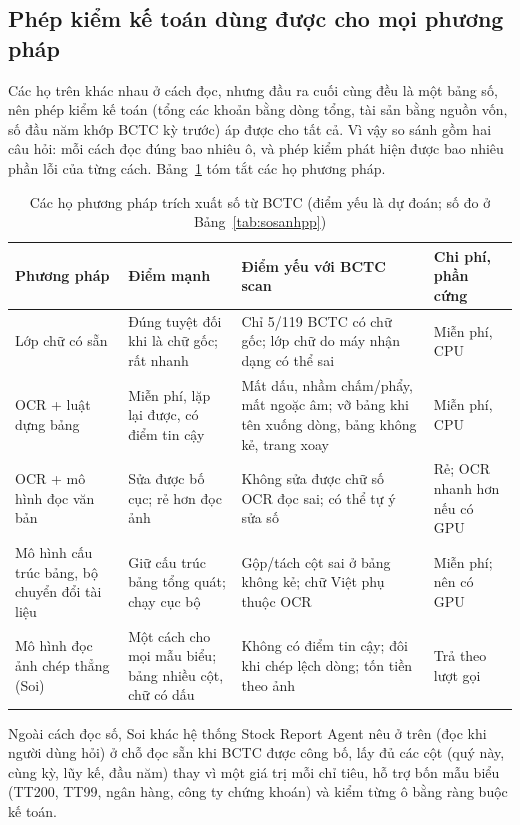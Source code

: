 \documentclass[12pt,a4paper]{report}
\begin{document}
\subsection{Phép kiểm kế toán dùng được cho mọi phương pháp}
Các họ trên khác nhau ở cách đọc, nhưng đầu ra cuối cùng đều là một bảng số, nên phép kiểm kế toán (tổng các khoản bằng
dòng tổng, tài sản bằng nguồn vốn, số đầu năm khớp BCTC kỳ trước) áp được cho tất cả. Vì vậy so sánh gồm hai câu hỏi: mỗi
cách đọc đúng bao nhiêu ô, và phép kiểm phát hiện được bao nhiêu phần lỗi của từng cách. Bảng~\ref{tab:phuongphap} tóm tắt
các họ phương pháp.

\begin{table}[H]
\centering\small
\caption{Các họ phương pháp trích xuất số từ BCTC (điểm yếu là dự đoán; số đo ở Bảng~\ref{tab:sosanhpp})}\label{tab:phuongphap}
\begin{tabularx}{\linewidth}{@{}>{\raggedright\arraybackslash}p{2.7cm}>{\raggedright\arraybackslash}X>{\raggedright\arraybackslash}X>{\raggedright\arraybackslash}p{2.4cm}@{}}
\toprule
\textbf{Phương pháp} & \textbf{Điểm mạnh} & \textbf{Điểm yếu với BCTC scan} & \textbf{Chi phí, phần cứng} \\ \midrule
Lớp chữ có sẵn & Đúng tuyệt đối khi là chữ gốc; rất nhanh & Chỉ 5/119 BCTC có chữ gốc; lớp chữ do máy nhận dạng có thể sai
& Miễn phí, CPU \\
OCR + luật dựng bảng & Miễn phí, lặp lại được, có điểm tin cậy & Mất dấu, nhầm chấm/phẩy, mất ngoặc âm; vỡ bảng khi tên
xuống dòng, bảng không kẻ, trang xoay & Miễn phí, CPU \\
OCR + mô hình đọc văn bản & Sửa được bố cục; rẻ hơn đọc ảnh & Không sửa được chữ số OCR đọc sai; có thể tự ý sửa số
& Rẻ; OCR nhanh hơn nếu có GPU \\
Mô hình cấu trúc bảng, bộ chuyển đổi tài liệu & Giữ cấu trúc bảng tổng quát; chạy cục bộ & Gộp/tách cột sai ở bảng không
kẻ; chữ Việt phụ thuộc OCR & Miễn phí; nên có GPU \\
Mô hình đọc ảnh chép thẳng (Soi) & Một cách cho mọi mẫu biểu; bảng nhiều cột, chữ có dấu & Không có điểm tin cậy; đôi khi
chép lệch dòng; tốn tiền theo ảnh & Trả theo lượt gọi \\
\bottomrule
\end{tabularx}
\end{table}

Ngoài cách đọc số, Soi khác hệ thống Stock Report Agent nêu ở trên (đọc khi người dùng hỏi) ở chỗ đọc sẵn khi BCTC được công bố, lấy đủ các cột (quý
này, cùng kỳ, lũy kế, đầu năm) thay vì một giá trị mỗi chỉ tiêu, hỗ trợ bốn mẫu biểu (TT200, TT99, ngân hàng, công ty
chứng khoán) và kiểm từng ô bằng ràng buộc kế toán.
\end{document}
